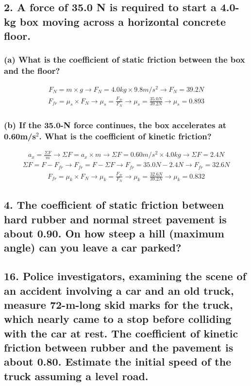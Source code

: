 \documentclass[12pt,a4paper,english]{article}
\begin{document}
\begin{flushleft}
  \subsection{2. A force of 35.0 N is required to start a 4.0-kg box moving across a horizontal concrete floor.}
  \subsubsection{(a) What is the coefficient of static friction between the box and the floor?}
  \begin{align*}
    F_N=m\times g \rightarrow
    F_N=4.0kg\times 9.8m/s^2\rightarrow
    F_N=39.2N
  \end{align*}
  \begin{align*}
    F_{fr}=\mu_s \times F_N \rightarrow
    \mu_s=\frac{F_{fr}}{F_N}\rightarrow
    \mu_s=\frac{35.0N}{39.2N}\rightarrow
    \mu_s=0.893
  \end{align*}
  \subsubsection{(b) If the 35.0-N force continues, the box accelerates at 0.60m/s$^2$. What is the coefficient of kinetic friction?}
  \begin{align*}
    a_x=\frac{\Sigma F}{m}\rightarrow
    \Sigma F=a_x\times m \rightarrow
    \Sigma F=0.60m/s^2\times4.0kg\rightarrow
    \Sigma F=2.4N
  \end{align*}
  \begin{align*}
    \Sigma F=F-F_{fr}\rightarrow
    F_{fr}=F-\Sigma F\rightarrow
    F_{fr}=35.0N-2.4N\rightarrow
    F_{fr}=32.6N
  \end{align*}
  \begin{align*}
    F_{fr}=\mu_k\times F_N\rightarrow
    \mu_k=\frac{F_{fr}}{F_N}\rightarrow
    \mu_k=\frac{32.6N}{39.2N}\rightarrow
    \mu_k=0.832
  \end{align*}
  \subsection{4. The coefficient of static friction between hard rubber and normal street pavement is about 0.90. On how steep a hill (maximum angle) can you leave a car parked?}
  \subsection{16. Police investigators, examining the scene of an accident involving a car and an old truck, measure 72-m-long skid marks for the truck, which nearly came to a stop before colliding with the car at rest. The coefficient of kinetic friction between rubber and the pavement is about 0.80. Estimate the initial speed of the truck assuming a level road.}

\end{flushleft}
\end{document}
